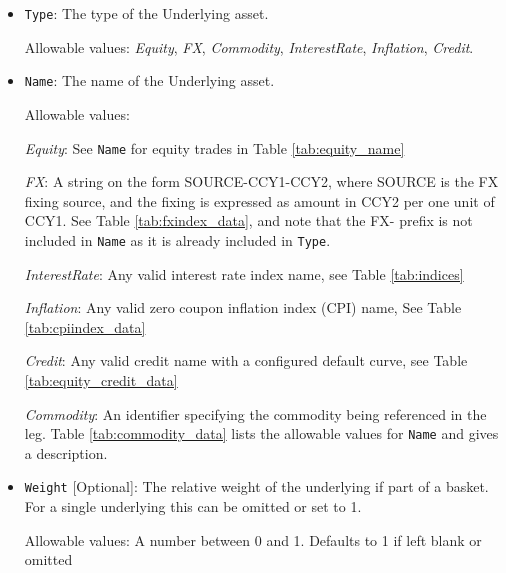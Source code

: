 \begin{itemize}

\item \lstinline!Type!: The type of the Underlying asset.

  Allowable values:  \emph{Equity}, \emph{FX}, \emph{Commodity}, \emph{InterestRate}, \emph{Inflation}, \emph{Credit}.

\item \lstinline!Name!:
  The name of the Underlying asset. 
  
  Allowable values:  

  \emph{Equity}: See \lstinline!Name! for equity trades in Table \ref{tab:equity_name}

  \emph{FX}: A string on the form SOURCE-CCY1-CCY2, where SOURCE is the FX fixing source, and the fixing is expressed as amount in CCY2 per one unit of CCY1.  See Table \ref{tab:fxindex_data}, and note that the FX- prefix is not included in \lstinline!Name! as it is already included in \lstinline!Type!.

 \emph{InterestRate}: Any valid interest rate index name, see Table \ref{tab:indices}

 \emph{Inflation}: Any valid zero coupon inflation index (CPI) name, See Table \ref{tab:cpiindex_data}

 \emph{Credit}: Any valid credit name with a configured default curve, see Table \ref{tab:equity_credit_data}

 \emph{Commodity}: An identifier specifying the commodity being referenced in the leg.
Table \ref{tab:commodity_data} lists the allowable values for \lstinline!Name! and gives a description. \\

\item \lstinline!Weight! [Optional]:
The relative weight of the underlying if part of a basket. For a single underlying this can be omitted or set to 1. 

Allowable values: A number between 0 and 1. Defaults to 1 if left blank or omitted


\end{itemize}

